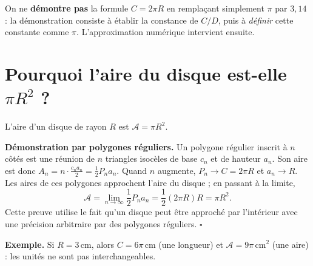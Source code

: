 \documentclass[../cours_spe_trigo.tex]{subfiles}
\begin{document}
\begin{attention}
On ne \textbf{démontre pas} la formule $C=2\pi R$ en remplaçant simplement $\pi$ par $3{,}14$ : la démonstration consiste à établir la constance de $C/D$, puis à \emph{définir} cette constante comme $\pi$. L'approximation numérique intervient ensuite.
\end{attention}

\section{Pourquoi l'aire du disque est-elle $\pi R^2$ ?}
\begin{propriete}
L'aire d'un disque de rayon $R$ est $\boxed{\mathcal A=\pi R^2}$.
\end{propriete}
\begin{demonstration}
\textbf{Démonstration par polygones réguliers.} Un polygone régulier inscrit à $n$ côtés est une réunion de $n$ triangles isocèles de base $c_n$ et de hauteur $a_n$. Son aire est donc $A_n=n\cdot\frac{c_na_n}{2}=\frac12P_na_n$. Quand $n$ augmente, $P_n\to C=2\pi R$ et $a_n\to R$. Les aires de ces polygones approchent l'aire du disque ; en passant à la limite,
\[
\mathcal A=\lim_{n\to\infty}\frac12P_na_n=\frac12(2\pi R)R=\boxed{\pi R^2}.
\]
Cette preuve utilise le fait qu'un disque peut être approché par l'intérieur avec une précision arbitraire par des polygones réguliers. $\square$
\end{demonstration}
\textbf{Exemple.} Si $R=3\,\mathrm{cm}$, alors $C=6\pi\,\mathrm{cm}$ (une longueur) et $\mathcal A=9\pi\,\mathrm{cm}^2$ (une aire) : les unités ne sont pas interchangeables.
\end{document}
